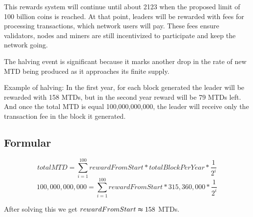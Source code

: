 \documentclass[a4paper, 11pt]{article}
\begin{document}
This rewards system will continue until about 2123 when the proposed limit of 100 billion coins is reached. At that point, leaders will be rewarded with fees for processing transactions, which network users will pay. These fees ensure validators, nodes and miners are still incentivized to participate and keep the network going.

The halving event is significant because it marks another drop in the rate of new MTD being produced as it approaches its finite supply. 

Example of halving:
  In the first year, for each block generated the leader will be rewarded with 158 MTDs, but in the second year reward will be 79 MTDs left.
  And once the total MTD is equal 100,000,000,000, the leader will receive only the transaction fee in the block it generated.
\subsection{Formular}

$$ totalMTD = \sum_{i=1}^{100} rewardFromStart * totalBlockPerYear * \frac{1}{2^i} $$
$$ 100,000,000,000 = \sum_{i=1}^{100} rewardFromStart * 315,360,000 * \frac{1}{2^i} $$

After solving this we get $rewardFromStart \thickapprox 158$ MTDs.

\pagebreak
\end{document}
